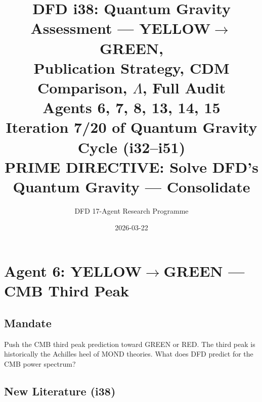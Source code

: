 \documentclass[11pt,a4paper]{article}
\title{DFD i38: Quantum Gravity Assessment --- YELLOW$\to$GREEN,\\Publication Strategy, CDM Comparison, $\Lambda$, Full Audit\\[6pt]
\large Agents 6, 7, 8, 13, 14, 15\\[6pt]
\normalsize Iteration 7/20 of Quantum Gravity Cycle (i32--i51)\\
PRIME DIRECTIVE: Solve DFD's Quantum Gravity --- Consolidate}
\author{DFD 17-Agent Research Programme}
\date{2026-03-22}
\begin{document}
\maketitle
\tableofcontents
\newpage

\section{Agent 6: YELLOW$\to$GREEN --- CMB Third Peak}
\label{sec:agent6}

\subsection{Mandate}

Push the CMB third peak prediction toward GREEN or RED. The third peak is historically the Achilles heel of MOND theories. What does DFD predict for the CMB power spectrum?

\subsection{New Literature (i38)}
\end{document}
